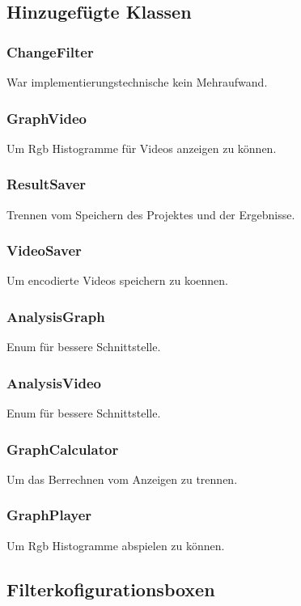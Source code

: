 \documentclass{scrartcl}
\begin{document}
{\subsection{Hinzugefügte Klassen}
\bigskip
\subsubsection{ChangeFilter}
War implementierungstechnische kein Mehraufwand.
\subsubsection{GraphVideo}
Um Rgb Histogramme für Videos anzeigen zu können.
\subsubsection{ResultSaver}
Trennen vom Speichern des Projektes und der Ergebnisse.
\subsubsection{VideoSaver}
Um encodierte Videos speichern zu koennen.
\subsubsection{AnalysisGraph}
Enum für bessere Schnittstelle.
\subsubsection{AnalysisVideo}
Enum für bessere Schnittstelle.
\subsubsection{GraphCalculator}
Um das Berrechnen vom Anzeigen zu trennen.
\subsubsection{GraphPlayer}
Um Rgb Histogramme abspielen zu können.
\newpage
\subsection{Filterkofigurationsboxen}
}
\end{document}
